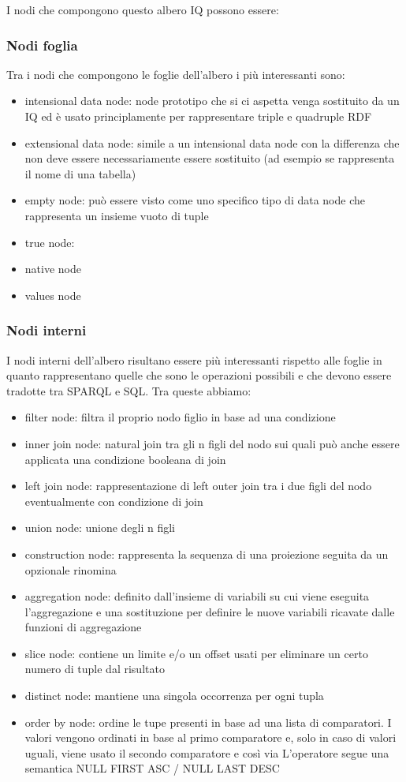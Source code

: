I nodi che compongono questo albero IQ possono essere:
\subsubsection*{Nodi foglia} 
Tra i nodi che compongono le foglie dell'albero i più interessanti sono:
    \begin{itemize}
        \item intensional data node: node prototipo che si ci aspetta venga sostituito da un IQ ed è usato principlamente per rappresentare triple e quadruple RDF
        \item extensional data node: simile a un intensional data node con la differenza che non deve essere necessariamente essere sostituito (ad esempio se rappresenta il nome di una tabella)
        \item empty node: può essere visto come uno specifico tipo di data node che rappresenta un insieme vuoto di tuple
        \item true node: 
        \item native node
        \item values node
    \end{itemize}
\subsubsection*{Nodi interni} 
I nodi interni dell'albero risultano essere più interessanti rispetto alle foglie in quanto rappresentano quelle che sono le operazioni possibili e che devono essere tradotte tra SPARQL e SQL. Tra queste abbiamo:
    \begin{itemize}
        \item filter node: filtra il proprio nodo figlio in base ad una condizione
        \item inner join node: natural join tra gli n figli del nodo sui quali può anche essere applicata una condizione booleana di join
        \item left join node: rappresentazione di left outer join tra i due figli del nodo eventualmente con condizione di join
        \item union node: unione degli n figli
        \item construction node: rappresenta la sequenza di una proiezione seguita da un opzionale rinomina
        \item aggregation node: definito dall'insieme di variabili su cui viene eseguita l'aggregazione e una sostituzione per definire le nuove variabili ricavate dalle funzioni di aggregazione
        \item slice node: contiene un limite e/o un offset usati per eliminare un certo numero di tuple dal risultato
        \item distinct node: mantiene una singola occorrenza per ogni tupla
        \item order by node: ordine le tupe presenti in base ad una lista di comparatori. I valori vengono ordinati in base al primo comparatore e, solo in caso di valori uguali, viene usato il secondo comparatore e così via
            L'operatore segue una semantica NULL FIRST ASC / NULL LAST DESC 
    \end{itemize} \cite{IQ}

